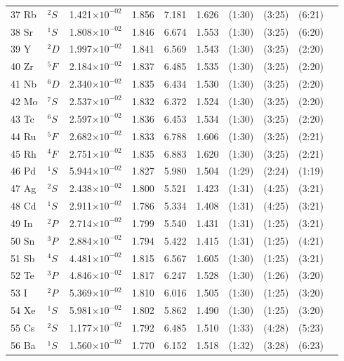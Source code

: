 \documentclass[12pt]{report}
\begin{document}
\begin{longtable}{l l r r r r r r r r}
37 Rb & $^{2}S$ & 1.421$\times10^{-02}$ & 1.856 & 7.181 & 1.626 & (1:30) & (3:25) & (6:21)   \\
38 Sr & $^{1}S$ & 1.808$\times10^{-02}$ & 1.846 & 6.674 & 1.553 & (1:30) & (3:25) & (6:20)   \\
39 Y & $^{2}D$ & 1.997$\times10^{-02}$ & 1.841 & 6.569 & 1.543 & (1:30) & (3:25) & (2:20)   \\
40 Zr & $^{5}F$ & 2.184$\times10^{-02}$ & 1.837 & 6.485 & 1.535 & (1:30) & (3:25) & (2:20)   \\
41 Nb & $^{6}D$ & 2.340$\times10^{-02}$ & 1.835 & 6.434 & 1.530 & (1:30) & (3:25) & (2:20)   \\
42 Mo & $^{7}S$ & 2.537$\times10^{-02}$ & 1.832 & 6.372 & 1.524 & (1:30) & (3:25) & (2:20)   \\
43 Tc & $^{6}S$ & 2.597$\times10^{-02}$ & 1.836 & 6.453 & 1.534 & (1:30) & (3:25) & (2:20)   \\
44 Ru & $^{5}F$ & 2.682$\times10^{-02}$ & 1.833 & 6.788 & 1.606 & (1:30) & (3:25) & (2:21)   \\
45 Rh & $^{4}F$ & 2.751$\times10^{-02}$ & 1.835 & 6.883 & 1.620 & (1:30) & (3:25) & (2:21)   \\
46 Pd & $^{1}S$ & 5.944$\times10^{-02}$ & 1.827 & 5.980 & 1.504 & (1:29) & (2:24) & (1:19)   \\
47 Ag & $^{2}S$ & 2.438$\times10^{-02}$ & 1.800 & 5.521 & 1.423 & (1:31) & (4:25) & (3:21)   \\
48 Cd & $^{1}S$ & 2.911$\times10^{-02}$ & 1.786 & 5.334 & 1.408 & (1:31) & (4:25) & (3:21)   \\
49 In & $^{2}P$ & 2.714$\times10^{-02}$ & 1.799 & 5.540 & 1.431 & (1:31) & (1:25) & (3:21)   \\
50 Sn & $^{3}P$ & 2.884$\times10^{-02}$ & 1.794 & 5.422 & 1.415 & (1:31) & (1:25) & (4:21)   \\
51 Sb & $^{4}S$ & 4.481$\times10^{-02}$ & 1.815 & 6.567 & 1.605 & (1:30) & (1:25) & (3:21)   \\
52 Te & $^{3}P$ & 4.846$\times10^{-02}$ & 1.817 & 6.247 & 1.528 & (1:30) & (1:26) & (3:20)   \\
53 I & $^{2}P$ & 5.369$\times10^{-02}$ & 1.810 & 6.016 & 1.505 & (1:30) & (1:25) & (3:20)   \\
54 Xe & $^{1}S$ & 5.981$\times10^{-02}$ & 1.802 & 5.862 & 1.490 & (1:30) & (1:25) & (3:20)   \\
55 Cs & $^{2}S$ & 1.177$\times10^{-02}$ & 1.792 & 6.485 & 1.510 & (1:33) & (4:28) & (5:23)   \\
56 Ba & $^{1}S$ & 1.560$\times10^{-02}$ & 1.770 & 6.152 & 1.518 & (1:32) & (3:28) & (6:23)   \\

\end{longtable}
\end{document}
